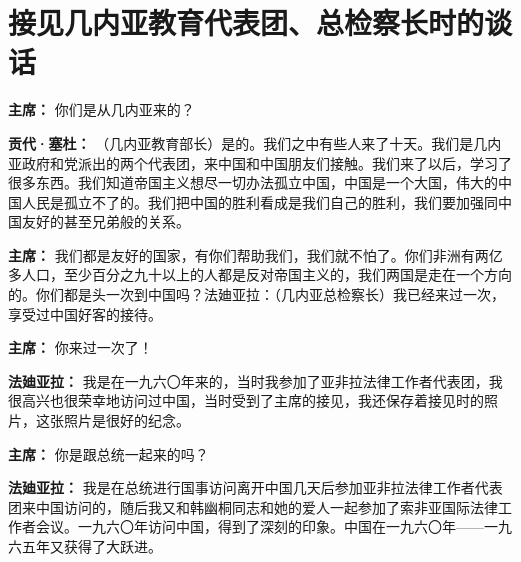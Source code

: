 \section[接见几内亚教育代表团、总检察长时的谈话（一九六五年八月八日）]{接见几内亚教育代表团、总检察长时的谈话}

\begin{list}{}{
    \setlength{\topsep}{0pt}        %
    \setlength{\partopsep}{0pt}     %
    \setlength{\parsep}{\parskip}   %
    \setlength{\itemsep}{\lineskip}       %
    \setlength{\labelsep}{0pt}%
    \setlength{\labelwidth}{3em}%
    \setlength{\itemindent}{0pt}%
    \setlength\listparindent{\parindent}
    \setlength{\leftmargin}{3em}
    \setlength{\rightmargin}{0pt}
    }

\item[\textbf{主席：}] 你们是从几内亚来的？

\item[\textbf{贡代·塞杜：}] （几内亚教育部长）是的。我们之中有些人来了十天。我们是几内亚政府和党派出的两个代表团，来中国和中国朋友们接触。我们来了以后，学习了很多东西。我们知道帝国主义想尽一切办法孤立中国，中国是一个大国，伟大的中国人民是孤立不了的。我们把中国的胜利看成是我们自己的胜利，我们要加强同中国友好的甚至兄弟般的关系。

\item[\textbf{主席：}] 我们都是友好的国家，有你们帮助我们，我们就不怕了。你们非洲有两亿多人口，至少百分之九十以上的人都是反对帝国主义的，我们两国是走在一个方向的。你们都是头一次到中国吗？法廸亚拉：（几内亚总检察长）我已经来过一次，享受过中国好客的接待。

\item[\textbf{主席：}] 你来过一次了！

\item[\textbf{法廸亚拉：}] 我是在一九六〇年来的，当时我参加了亚非拉法律工作者代表团，我很高兴也很荣幸地访问过中国，当时受到了主席的接见，我还保存着接见时的照片，这张照片是很好的纪念。

\item[\textbf{主席：}] 你是跟总统一起来的吗？

\item[\textbf{法廸亚拉：}] 我是在总统进行国事访问离开中国几天后参加亚非拉法律工作者代表团来中国访问的，随后我又和韩幽桐同志和她的爱人一起参加了索非亚国际法律工作者会议。一九六〇年访问中国，得到了深刻的印象。中国在一九六〇年——一九六五年又获得了大跃进。


\end{list}
